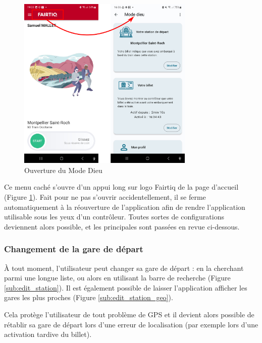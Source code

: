 \documentclass[a4paper]{article}
\newcommand{\modedieu}{\og Mode Dieu \fg}
\begin{document}
\begin{figure}[h]
  \centering
  \includegraphics[width=0.75\textwidth]{illustrations/images/mode_dieu/ouverture_mode_dieu.png}
  \caption{Ouverture du \modedieu}
  \label{fig:ouverture_mode_dieu}
\end{figure}


Ce menu caché s'ouvre d'un appui long sur logo Fairtiq de la page d'accueil (Figure \ref*{fig:ouverture_mode_dieu}).
Fait pour ne pas s'ouvrir accidentellement, il se ferme automatiquement à la réouverture de l'application
afin de rendre l'application utilisable sous les yeux d'un contrôleur. Toutes sortes de configurations
deviennent alors possible, et les principales sont passées en revue ci-dessous.



\subsubsection{Changement de la gare de départ}

À tout moment, l'utilisateur peut changer sa gare de départ : en la cherchant parmi une longue liste,
ou alors en utilisant la barre de recherche (Figure \ref{sub:edit_station}). Il est également
possible de laisser l'application afficher les gares les plus proches (Figure \ref{sub:edit_station_geo}).

Cela protège l'utilisateur de tout problème de GPS et il devient alors possible de rétablir sa gare
de départ lors d'une erreur de localisation (par exemple lors d'une activation tardive du billet).
\end{document}
